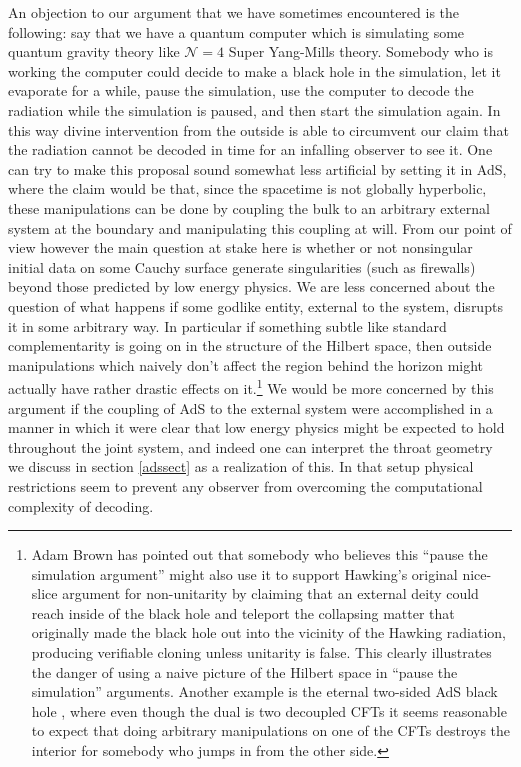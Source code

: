 \documentclass[12pt]{article}
\begin{document}
An objection to our argument that we have sometimes encountered is the following: say that we have a quantum computer which is simulating some quantum gravity theory like $\mathcal{N}=4$ Super Yang-Mills theory.  Somebody who is working the computer could decide to make a black hole in the simulation, let it evaporate for a while, pause the simulation, use the computer to decode the radiation while the simulation is paused, and then start the simulation again.  In this way divine intervention from the outside is able to circumvent our claim that the radiation cannot be decoded in time for an infalling observer to see it.  One can try to make this proposal sound somewhat less artificial by setting it in AdS, where the claim would be that, since the spacetime is not globally hyperbolic, these manipulations can be done by coupling the bulk to an arbitrary external system at the boundary and manipulating this coupling at will.  From our point of view however the main question at stake here is whether or not nonsingular initial data on some Cauchy surface generate singularities (such as firewalls) beyond those predicted by low energy physics.  We are less concerned about the question of what happens if some godlike entity, external to the system, disrupts it in some arbitrary way.  In particular if something subtle like standard complementarity is going on in the structure of the Hilbert space, then outside manipulations which naively don't affect the region behind the horizon might actually have rather drastic effects on it.\footnote{Adam Brown has pointed out that somebody who believes this ``pause the simulation argument'' might also use it to support Hawking's original nice-slice argument for non-unitarity by claiming that an external deity could reach inside of the black hole and teleport the collapsing matter that originally made the black hole out into the vicinity of the Hawking radiation, producing verifiable cloning unless unitarity is false.  This clearly illustrates the danger of using a naive picture of the Hilbert space in ``pause the simulation'' arguments.  Another example is the eternal two-sided AdS black hole \cite{Maldacena:2001kr}, where even though the dual is two decoupled CFTs it seems reasonable to expect that doing arbitrary manipulations on one of the CFTs destroys the interior for somebody who jumps in from the other side.}  We would be more concerned by this argument if the coupling of AdS to the external system were accomplished in a manner in which it were clear that low energy physics might be expected to hold throughout the joint system, and indeed one can interpret the throat geometry we discuss in section \ref{adssect} as a realization of this.  In that setup physical restrictions seem to prevent any observer from overcoming the computational complexity of decoding.  
\end{document}
